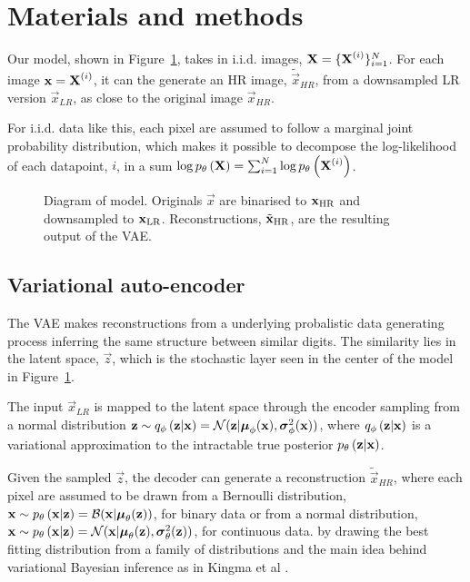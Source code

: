 \section{Materials and methods}
\label{sec:method}

Our model, shown in Figure~\ref{fig:diagram}, takes in i.i.d. images, $\bm{\mathrm{X}} = \{\bm{\mathrm{X}}^{(i)}\}^N_{i=1}$. For each image $\bm{\mathrm{x}} = \bm{\mathrm{X}}^{(i)}$, it can the generate an HR image, $\tilde{\vec{x}}_{HR}$, from a downsampled LR version $\vec{x}_{LR}$, as close to the original image $\vec{x}_{HR}$.

For i.i.d. data like this, each pixel are assumed to follow a marginal joint probability distribution, which makes it possible to decompose the log-likelihood of each datapoint, $i$, in a sum $\log p_{\theta}\left(\bm{\mathrm{X}}\right) = \sum^N_{i=1} \log p_{\theta}\left(\bm{\mathrm{X}}^{(i)}\right)$. 

\begin{figure*}
	\centering
	
	\caption{Diagram of model. Originals $\vec{x}$ are binarised to $\bm{\mathrm{x}}_{\text{HR}}$ and downsampled to $\bm{\mathrm{x}}_{\text{LR}}$. Reconstructions, $\tilde{\bm{\mathrm{x}}}_{\text{HR}}$, are the resulting output of the VAE.}
	\label{fig:diagram}
\end{figure*}

\subsection{Variational auto-encoder}
\label{sub:vae}

The VAE makes reconstructions from a underlying probalistic data generating process inferring the same structure between similar digits. The similarity lies in the latent space, $\vec{z}$, which is the stochastic layer seen in the center of the model in Figure~\ref{fig:diagram}. 

The input $\vec{x}_{LR}$ is mapped to the latent space through the encoder sampling from a normal distribution
$\bm{\mathrm{z}} \sim q_{\phi}\left(\bm{\mathrm{z}}|\bm{\mathrm{x}}\right) = \mathcal{N}( \bm{\mathrm{z}}|\bm{\mathrm{\mu}}_\phi(\bm{\mathrm{x}}),\bm{\mathrm{\sigma}}^2_\phi(\bm{\mathrm{x}}))$, where $q_{\phi}\left(\bm{\mathrm{z}}|\bm{\mathrm{x}}\right)$ is a variational approximation to the intractable true posterior $p_{\theta}\left(\bm{\mathrm{z}}|\bm{\mathrm{x}}\right)$.

Given the sampled $\vec{z}$, the decoder can generate a reconstruction $\tilde{\vec{x}}_{HR}$, where each pixel are assumed to be drawn from a Bernoulli distribution, $\bm{\mathrm{x}} \sim p_{\theta}\left(\bm{\mathrm{x}}|\bm{\mathrm{z}}\right)=\mathcal{B}( \bm{\mathrm{x}}|\bm{\mathrm{\mu}}_\theta(\bm{\mathrm{z}}))$, for binary data or from a normal distribution, $\bm{\mathrm{x}} \sim p_{\theta}\left(\bm{\mathrm{x}}|\bm{\mathrm{z}}\right)=\mathcal{N}( \bm{\mathrm{x}}|\bm{\mathrm{\mu}}_\theta(\bm{\mathrm{z}}),\bm{\mathrm{\sigma}}^2_\theta(\bm{\mathrm{z}}))$, for continuous data.
 by drawing the best fitting distribution from a family of distributions and the main idea behind variational Bayesian inference as in Kingma et al \cite{Kingma2013}. 
 
